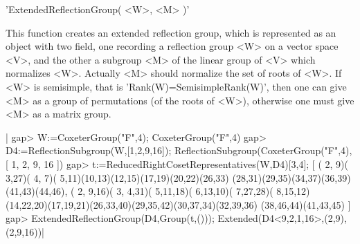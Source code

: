 
'ExtendedReflectionGroup( <W>, <M> )'

This function creates an extended reflection group, which is represented as
an  object with two field, one recording a reflection group <W> on a vector
space  <V>, and the other  a subgroup <M> of  the linear group of <V> which
normalizes  <W>. Actually <M> should normalize the  set of roots of <W>. If
<W>  is semisimple, that is  'Rank(W)=SemisimpleRank(W)', then one can give
<M>  as a group of  permutations (of the roots  of <W>), otherwise one must
give <M> as a matrix group.

|    gap> W:=CoxeterGroup("F",4);
    CoxeterGroup("F",4)
    gap> D4:=ReflectionSubgroup(W,[1,2,9,16]);
    ReflectionSubgroup(CoxeterGroup("F",4), [ 1, 2, 9, 16 ])
    gap> t:=ReducedRightCosetRepresentatives(W,D4){[3,4]};
    [ ( 2, 9)( 3,27)( 4, 7)( 5,11)(10,13)(12,15)(17,19)(20,22)(26,33)
        (28,31)(29,35)(34,37)(36,39)(41,43)(44,46),
      ( 2, 9,16)( 3, 4,31)( 5,11,18)( 6,13,10)( 7,27,28)( 8,15,12)
        (14,22,20)(17,19,21)(26,33,40)(29,35,42)(30,37,34)(32,39,36)
        (38,46,44)(41,43,45) ]
    gap> ExtendedReflectionGroup(D4,Group(t,()));
    Extended(D4<9,2,1,16>,(2,9),(2,9,16))|

